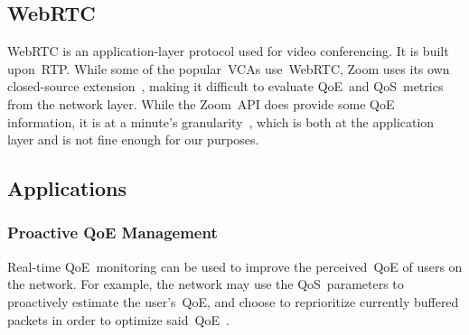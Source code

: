     \subsection{WebRTC}\label{introduction:webrtc}
        WebRTC is an application-layer protocol used for video conferencing. It is built upon~RTP. While some of the popular~VCAs use~WebRTC, Zoom uses its own closed-source extension~\autocite{marczak2020}, making it difficult to evaluate QoE~and QoS~metrics from the network layer. While the Zoom~API does provide some QoE information, it is at a minute's granularity~\autocite{walia2019}, which is both at the application layer and is not fine enough for our purposes.

    \subsection{Applications}\label{introduction:applications}
        \subsubsection{Proactive QoE Management}\label{introduction:applications:management}
            Real-time QoE~monitoring can be used to improve the perceived~QoE of users on the network. For example, the network may use the QoS~parameters to proactively estimate the user's~QoE, and choose to reprioritize currently buffered packets in order to optimize said~QoE~\autocite{DinakiHosseinEbrahimi2021FVQW}.
